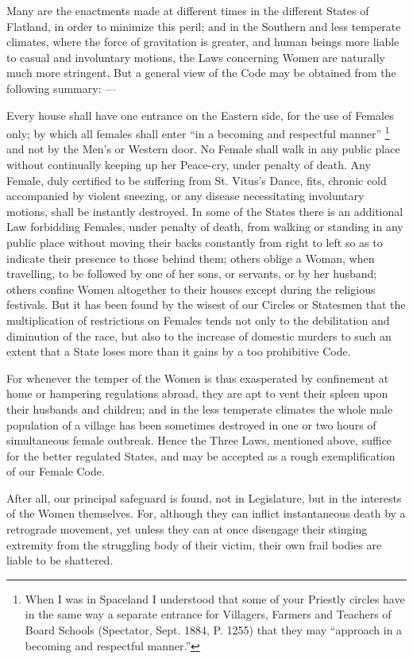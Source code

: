 \documentclass[12pt, a4paper, oneside]{memoir}
\begin{document}
Many are the enactments made at different times in the different States of
Flatland, in order to minimize this peril; and in the Southern and less
temperate climates, where the force of gravitation is greater, and human
beings more liable to casual and involuntary motions, the Laws concerning
Women are naturally much more stringent. But a general view of the Code may be
obtained from the following summary: ---

Every house shall have one entrance on the Eastern side, for the use of
Females only; by which all females shall enter ``in a becoming and respectful
manner'' \footnote{ When I was in Spaceland I understood that some of your
Priestly circles have in the same way a separate entrance for Villagers,
Farmers and Teachers of Board Schools (Spectator, Sept. 1884, P. 1255) that
they may ``approach in a becoming and respectful manner.''} and not by the Men's
or Western door.  No Female shall walk in any public place without continually
keeping up her Peace-cry, under penalty of death.  Any Female, duly certified
to be suffering from St. Vitus's Dance, fits, chronic cold accompanied by
violent sneezing, or any disease necessitating involuntary motions, shall be
instantly destroyed.  In some of the States there is an additional Law
forbidding Females, under penalty of death, from walking or standing in any
public place without moving their backs constantly from right to left so as to
indicate their presence to those behind them; others oblige a Woman, when
travelling, to be followed by one of her sons, or servants, or by her husband;
others confine Women altogether to their houses except during the religious
festivals. But it has been found by the wisest of our Circles or Statesmen
that the multiplication of restrictions on Females tends not only to the
debilitation and diminution of the race, but also to the increase of domestic
murders to such an extent that a State loses more than it gains by a too
prohibitive Code.

For whenever the temper of the Women is thus exasperated by confinement at
home or hampering regulations abroad, they are apt to vent their spleen upon
their husbands and children; and in the less temperate climates the whole male
population of a village has been sometimes destroyed in one or two hours of
simultaneous female outbreak. Hence the Three Laws, mentioned above, suffice
for the better regulated States, and may be accepted as a rough
exemplification of our Female Code.

After all, our principal safeguard is found, not in Legislature, but in the
interests of the Women themselves. For, although they can inflict
instantaneous death by a retrograde movement, yet unless they can at once
disengage their stinging extremity from the struggling body of their victim,
their own frail bodies are liable to be shattered.
\end{document}
